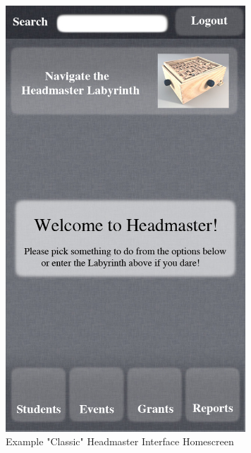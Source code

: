 \documentclass{article}
\begin{document}
\begin{figure}
\centering
\includegraphics[width=90mm]{classic-homepage.jpg}
\caption{Example "Classic" Headmaster Interface Homescreen}
\end{figure}
\end{document}
